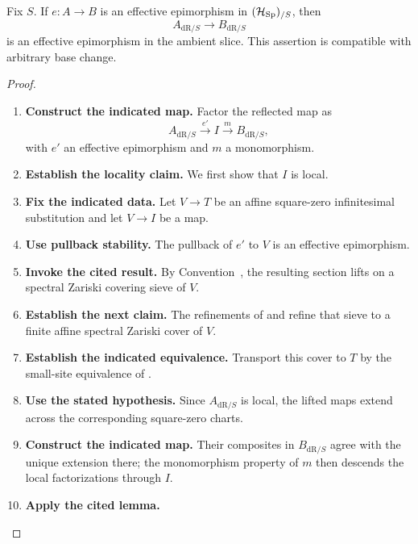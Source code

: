 \begin{theorem}
\label{thm:de-Rham-preserves-effective-epis}
Fix \(S\). If \(e:A\to B\) is an effective epimorphism in
\((\mathcal H_{\operatorname{Sp}})_{/S}\), then
\[
  A_{\mathrm{dR}/S}\longrightarrow B_{\mathrm{dR}/S}
\]
is an effective epimorphism in the ambient slice. This assertion is compatible with
arbitrary base change.
\end{theorem}

\begin{proof}
\leavevmode
\begin{enumerate}[label=\textup{(\arabic*)}]
    \item \textbf{Construct the indicated map.}
    Factor the reflected map as
    \[
    A_{\mathrm{dR}/S}\xrightarrow{e'}I\xrightarrow{m}B_{\mathrm{dR}/S},
    \]
    with \(e'\) an effective epimorphism and \(m\) a monomorphism.
    \item \textbf{Establish the locality claim.}
    We first show that \(I\) is
    local.
    \item \textbf{Fix the indicated data.}
    Let \(V\to T\) be an affine square-zero infinitesimal substitution and
    let \(V\to I\) be a map.
    \item \textbf{Use pullback stability.}
    The pullback of \(e'\) to \(V\) is an effective
    epimorphism.
    \item \textbf{Invoke the cited result.}
    By Convention~, the
    resulting section lifts on a spectral Zariski covering sieve of \(V\).
    \item \textbf{Establish the next claim.}
    The
    refinements of  and
     refine that sieve to a finite affine
    spectral Zariski cover of \(V\).
    \item \textbf{Establish the indicated equivalence.}
    Transport this cover to
    \(T\) by the small-site equivalence of
    .
    \item \textbf{Use the stated hypothesis.}
    Since
    \(A_{\mathrm{dR}/S}\) is local, the lifted maps extend across the corresponding
    square-zero charts.
    \item \textbf{Construct the indicated map.}
    Their composites in \(B_{\mathrm{dR}/S}\) agree with the
    unique extension there; the monomorphism property of \(m\) then descends the local
    factorizations through \(I\).
    \item \textbf{Apply the cited lemma.}

\end{enumerate}
\end{proof}
